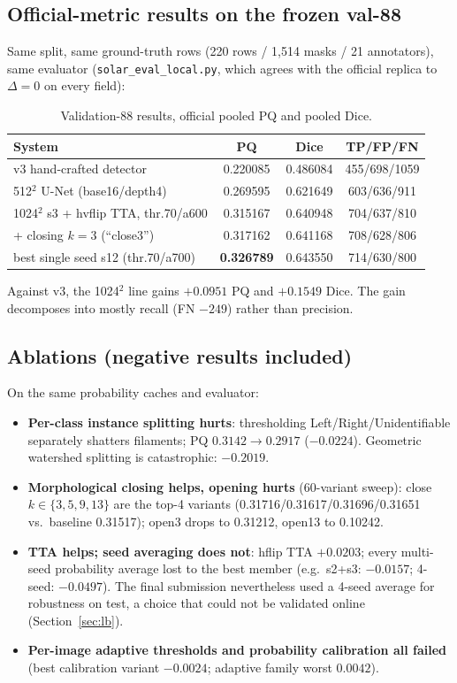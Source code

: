 \documentclass[11pt]{article}
\begin{document}
\subsection{Official-metric results on the frozen val-88}
Same split, same ground-truth rows (220 rows / 1{,}514 masks / 21
annotators), same evaluator (\texttt{solar\_eval\_local.py}, which agrees
with the official replica to $\Delta=0$ on every field):

\begin{table}[h]
\centering
\caption{Validation-88 results, official pooled PQ and pooled Dice.}
\begin{tabular}{lccc}
\toprule
System & PQ & Dice & TP/FP/FN\\
\midrule
v3 hand-crafted detector              & 0.220085 & 0.486084 & 455/698/1059\\
512$^2$ U-Net (base16/depth4)         & 0.269595 & 0.621649 & 603/636/911\\
1024$^2$ s3 + hvflip TTA, thr.70/a600 & 0.315167 & 0.640948 & 704/637/810\\
\quad + closing $k{=}3$ (``close3'')  & 0.317162 & 0.641168 & 708/628/806\\
best single seed s12 (thr.70/a700)    & \textbf{0.326789} & 0.643550 & 714/630/800\\
\bottomrule
\end{tabular}
\end{table}

Against v3, the 1024$^2$ line gains $+0.0951$ PQ and $+0.1549$ Dice. The
gain decomposes into mostly recall (FN $-249$) rather than precision.

\subsection{Ablations (negative results included)}
On the same probability caches and evaluator:
\begin{itemize}
\item \textbf{Per-class instance splitting hurts}: thresholding
      Left/Right/Unidentifiable separately shatters filaments;
      PQ $0.3142\to0.2917$ ($-0.0224$). Geometric watershed splitting is
      catastrophic: $-0.2019$.
\item \textbf{Morphological closing helps, opening hurts}
      (60-variant sweep): close $k\in\{3,5,9,13\}$ are the top-4 variants
      (0.31716/0.31617/0.31696/0.31651 vs.\ baseline 0.31517); open3 drops
      to 0.31212, open13 to 0.10242.
\item \textbf{TTA helps; seed averaging does not}: hflip TTA
      $+0.0203$; every multi-seed probability average lost to the best
      member (e.g.\ s2+s3: $-0.0157$; 4-seed: $-0.0497$). The final
      submission nevertheless used a 4-seed average for robustness on
      test, a choice that could not be validated online
      (Section~\ref{sec:lb}).
\item \textbf{Per-image adaptive thresholds and probability calibration
      all failed} (best calibration variant $-0.0024$; adaptive family
      worst $0.0042$).
\end{itemize}
\end{document}
